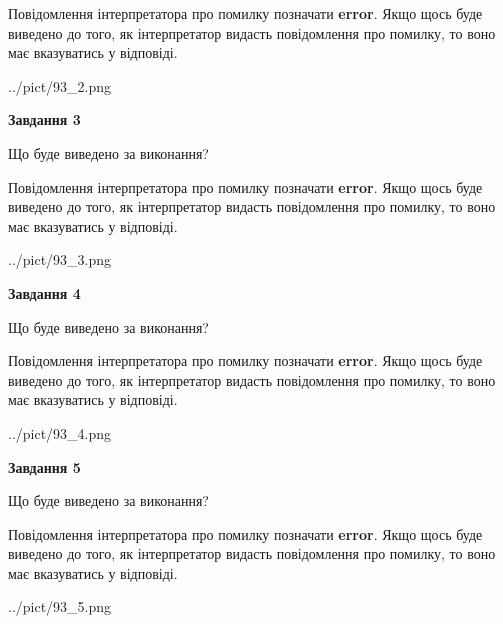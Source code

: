 \documentclass[12pt, ukrainian]{article}
\begin{document}
{\begin {large}
Повідомлення інтерпретатора про помилку позначати \textbf{error}.
Якщо щось буде виведено до того, як інтерпретатор видасть повідомлення про помилку, 
то воно має вказуватись у відповіді. \par


\begin{center}
	{../pict/93_2.png}
\end{center}
\newpage

{\begin {center}\textbf{Завдання 3}\end {center}}\par
Що буде виведено за виконання?

Повідомлення інтерпретатора про помилку позначати \textbf{error}.
Якщо щось буде виведено до того, як інтерпретатор видасть повідомлення про помилку, 
то воно має вказуватись у відповіді. \par


\begin{center}
	{../pict/93_3.png}
\end{center}
\newpage

{\begin {center}\textbf{Завдання 4}\end {center}}\par
Що буде виведено за виконання?

Повідомлення інтерпретатора про помилку позначати \textbf{error}.
Якщо щось буде виведено до того, як інтерпретатор видасть повідомлення про помилку, 
то воно має вказуватись у відповіді. \par


\begin{center}
	{../pict/93_4.png}
\end{center}
\newpage

{\begin {center}\textbf{Завдання 5}\end {center}}\par
Що буде виведено за виконання?

Повідомлення інтерпретатора про помилку позначати \textbf{error}.
Якщо щось буде виведено до того, як інтерпретатор видасть повідомлення про помилку, 
то воно має вказуватись у відповіді. \par


\begin{center}
	{../pict/93_5.png}
\end{center}
\newpage


\end{large}}
\end{document}
